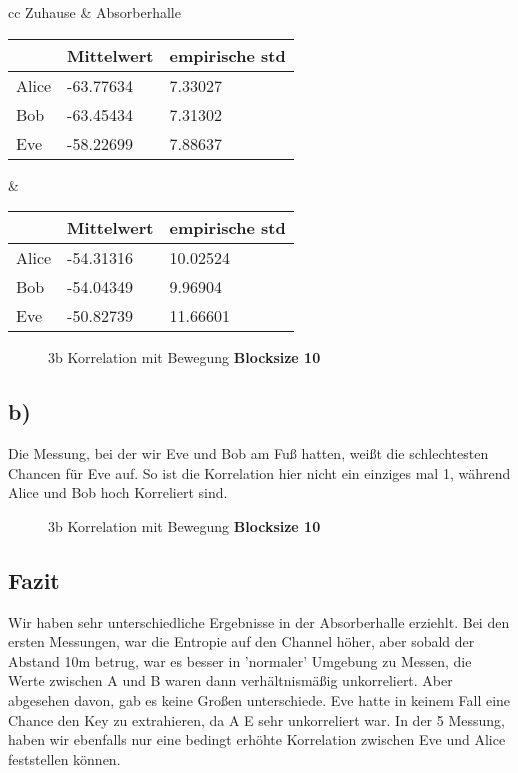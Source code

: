 \documentclass[12pt,a4paper]{article}
\begin{document}
\begin{table}[H]
\centering
\begin{tabular}{ cc }
Zuhause & Absorberhalle  \\
\begin{tabular}{l|l|l}
& Mittelwert & empirische std \\
\hline
Alice & -63.77634 & 7.33027 \\
\hline
Bob & -63.45434 & 7.31302 \\
\hline
Eve & -58.22699 & 7.88637 \\
\end{tabular} &
\begin{tabular}{l|l|l}
& Mittelwert & empirische std \\
\hline
Alice & -54.31316 & 10.02524 \\
\hline
Bob & -54.04349 & 9.96904 \\
\hline
Eve & -50.82739 & 11.66601 \\
\end{tabular}
\end{tabular}
\end{table}

\begin{figure}[H]
\centering
{}   \qquad
{}
\caption{3b Korrelation mit Bewegung \textbf{Blocksize 10}}
\label{fig:5}
\end{figure}
\subsection*{b)}
Die Messung, bei der wir Eve und Bob am Fuß hatten, weißt die schlechtesten Chancen für Eve auf. So ist die Korrelation hier nicht ein einziges mal 1, während Alice und Bob hoch Korreliert sind.
\begin{figure}[H]
\centering
{} \qquad
{}  
\caption{3b Korrelation mit Bewegung  \textbf{Blocksize 10}}
\label{fig:6}
\end{figure}
\newpage
\subsection*{Fazit}
Wir haben sehr unterschiedliche Ergebnisse in der Absorberhalle erziehlt. Bei den ersten Messungen, war die Entropie auf den Channel höher, aber sobald der Abstand 10m betrug, war es besser in 'normaler' Umgebung zu Messen, die Werte zwischen A und B waren dann verhältnismäßig unkorreliert. Aber abgesehen davon, gab es keine Großen unterschiede. Eve hatte in keinem Fall eine Chance den Key zu extrahieren, da A E sehr unkorreliert war. In der 5 Messung, haben wir ebenfalls nur eine bedingt erhöhte Korrelation zwischen Eve und Alice feststellen können.
\clearpage
\end{document}
